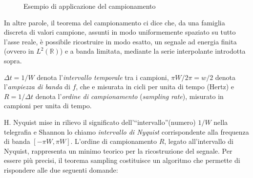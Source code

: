 \begin{figure}[H]
    \caption{Esempio di applicazione del campionamento}
\end{figure}

In altre parole, il teorema del campionamento ci dice che, da una famiglia discreta di
valori campione, assunti in modo uniformemente spaziato su tutto l’asse reale, è possibile
ricostruire in modo esatto, un segnale ad energia finita (ovvero in $L^2(\mathbb{R})$) e a
banda limitata, mediante la serie interpolante introdotta sopra.


$\Delta t = 1/W$ denota l’\textit{intervallo temporale} tra i campioni, $\pi W/ 2\pi = w/2$ denota
l’\textit{ampiezza di banda} di $f$, che e misurata in cicli per unita di tempo (Hertz) e
$R = 1 /\Delta t$ denota l’\textit{ordine di campionamento} (\textit{sampling rate}),
misurato in campioni per unita di tempo. 

H. Nyquist mise in rilievo il significato dell’“intervallo”(numero) $1/W$ nella telegrafia
e Shannon lo chiamo \textit{intervallo di Nyquist} corrispondente alla frequenza di
banda $[−\pi W, \pi W]$. L’ordine di campionamento $R$, legato all’intervallo di Nyquist,
rappresenta un minimo teorico per la ricostruzione del segnale.
Per essere più precisi, il teorema sampling costituisce un algoritmo che permette di
rispondere alle due seguenti domande:

